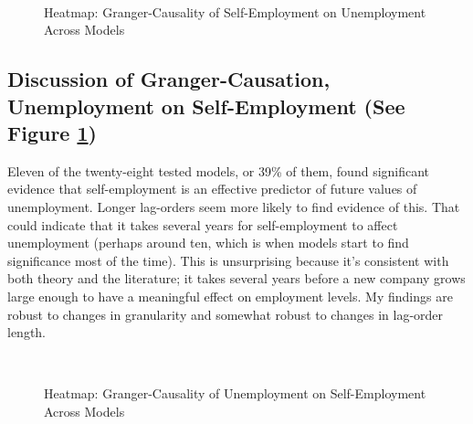 \documentclass[]{ecca}
\begin{document}
\begin{figure}[!h]
	\centering
	\medskip\\
	\caption{Heatmap: Granger-Causality of Self-Employment on Unemployment Across Models}
	\label{fig:hm-GC_SU}
\end{figure}
\subsection{Discussion of Granger-Causation, Unemployment on Self-Employment (See Figure \ref{fig:hm-GC_SU})}
Eleven of the twenty-eight tested models, or 39\% of them, found significant evidence that self-employment is an effective predictor of future values of unemployment. Longer lag-orders seem more likely to find evidence of this. That could indicate that it takes several years for self-employment to affect unemployment (perhaps around ten, which is when models start to find significance most of the time). This is unsurprising because it's consistent with both theory and the literature; it takes several years before a new company grows large enough to have a meaningful effect on employment levels. My findings are robust to changes in granularity and somewhat robust to changes in lag-order length.
 
\begin{figure}[!h]
	\centering
	\medskip\\
	\caption{Heatmap: Granger-Causality of Unemployment on Self-Employment Across Models}
	\label{fig:hm-GC_US}
\end{figure}
\end{document}
